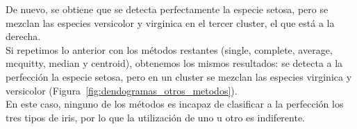 \documentclass[12pt,a4paper,twoside,openright,titlepage,final]{article}
\begin{document}
De nuevo, se obtiene que se detecta perfectamente la especie setosa, pero se mezclan las especies versicolor y virginica en el tercer cluster, el que está a la derecha.\\

Si repetimos lo anterior con los métodos restantes (single, complete, average, mcquitty, median y centroid), obtenemos los mismos resultados: se detecta a la perfección la especie setosa, pero en un cluster se mezclan las especies virginica y versicolor (Figura~\ref{fig:dendogramas_otros_metodos}).\\

En este caso, ninguno de los métodos es incapaz de clasificar a la perfección los tres tipos de iris, por lo que la utilización de uno u otro es indiferente.

\begin{figure}[htbp]
\centering
{}

\end{figure}
\end{document}
